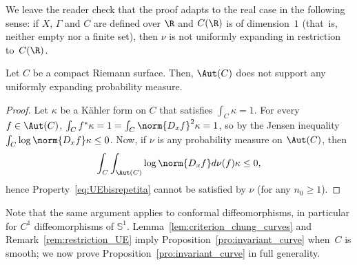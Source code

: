 \begin{rem}\label{rem:invariant_curve}
We leave the reader check that the proof adapts to the real case in the following sense: if $X$, $\Gamma$ and $C$ are defined over $\R$ and $C(\R)$ is of dimension~$1$ (that~is, neither empty nor a finite set), then $\nu$ is not uniformly expanding in restriction to~$C(\R)$.
\end{rem}

\begin{lem} \label{lem:criterion_chung_curves}
Let $C$ be a compact Riemann surface. Then, $\Aut(C)$ does not support any uniformly expanding probability measure.
\end{lem}

\begin{proof}
Let $\kappa$ be a Kähler form on $C$ that satisfies $\int_C\kappa = 1$. For every $f\in \Aut(C)$,
$\int_C f^*\kappa = 1= \int_C \norm{D_xf}^2 \kappa= 1$, so by the Jensen inequality
$\int_C \log \norm{D_xf } \kappa\leq 0$. Now, if $\nu$ is any probability measure on $\Aut(C)$, then
\[
\int_C \int_{\Aut(C)} \log \norm{D_xf } d\nu(f) \kappa\leq 0,
\]
hence Property~\eqref{eq:UEbisrepetita} cannot be satisfied
by $\nu$ (for any $n_0\geq 1$).
\end{proof}

Note that the same argument applies to conformal diffeomorphisms, in particular for $C^1$
diffeomorphisms of $\mathbb S^1$. Lemma~\ref{lem:criterion_chung_curves} and Remark~\ref{rem:restriction_UE}
imply Proposition~\ref{pro:invariant_curve} when~$C$ is smooth; we now prove Proposition~\ref{pro:invariant_curve} in full generality.

